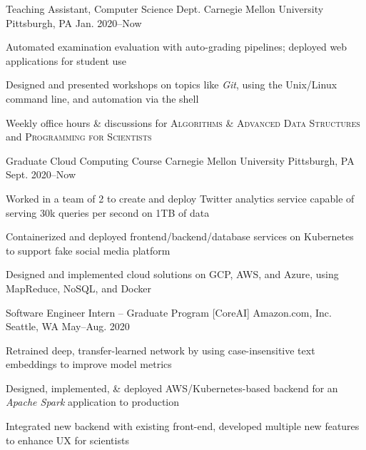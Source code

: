 \documentclass[10pt, letterpaper]{awesome-cv}
\begin{document}
\begin{cventries}

    \cventry
        {Teaching Assistant, Computer Science Dept.}
        {Carnegie Mellon University}
        {Pittsburgh, PA}
        {Jan. 2020--Now}
        {\begin{cvitems} 
            \item Automated examination evaluation with auto-grading pipelines; deployed web applications for student use
            \item Designed and presented workshops on topics like \textit{Git}, using the Unix/Linux command line, and automation via the shell
            \item Weekly office hours \& discussions for {\bodyfont\scshape\color{darktext} Algorithms \& Advanced Data Structures} and {\bodyfont\scshape\color{darktext} Programming for Scientists} 
        \end{cvitems}}   

    \cventry
        {Graduate Cloud Computing Course}
        {Carnegie Mellon University}
        {Pittsburgh, PA}
        {Sept. 2020--Now}
        {\begin{cvitems} 
            \item Worked in a team of 2 to create and deploy Twitter analytics service capable of serving 30k queries per second on 1TB of data
            \item Containerized and deployed frontend/backend/database services on Kubernetes to support fake social media platform
            \item Designed and implemented cloud solutions on GCP, AWS, and Azure, using MapReduce, NoSQL, and Docker
        \end{cvitems}}   
        
        \cventry
        {Software Engineer Intern -- Graduate Program [CoreAI]}
        {Amazon.com, Inc.}
        {Seattle, WA}
        {May--Aug. 2020}
        {\begin{cvitems} 
            \item Retrained deep, transfer-learned network by using case-insensitive text embeddings to improve model metrics
            \item Designed, implemented, \& deployed AWS/Kubernetes-based backend for an \textit{Apache Spark} application to production
            \item Integrated new backend with existing front-end, developed multiple new features to enhance UX for scientists
        \end{cvitems}}
        

\end{cventries}
\end{document}
